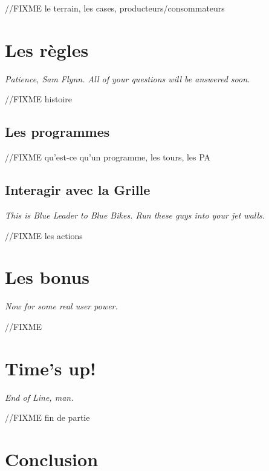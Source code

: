         //FIXME le terrain, les cases, producteurs/consommateurs

\newpage
\section{Les règles}
\textit{Patience, Sam Flynn. All of your questions will be answered soon.}

//FIXME histoire

        \subsection{Les programmes}
        //FIXME qu'est-ce qu'un programme, les tours, les PA

        \subsection{Interagir avec la Grille}
        \textit{This is Blue Leader to Blue Bikes. Run these guys into your jet walls.}

        //FIXME les actions

\newpage
\section{Les bonus}
\textit{Now for some real user power.}

//FIXME

\newpage
\section{Time's up!}
\textit{End of Line, man.}

//FIXME fin de partie

\newpage
\section{Conclusion}
